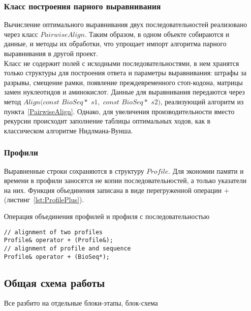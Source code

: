 \subsubsection[Класс построения парного выравнивания]{\large Класс построения парного выравнивания}
\hspace{\parindent} Вычисление оптимального выравнивания двух последовательностей реализовано через  класс $PairwiseAlign$. Таким образом, в одном объекте собираются и данные, и методы их обработки, что упрощает импорт алгоритма парного выравнивания в другой проект.\\
\indent Класс не содержит полей с исходными последовательностями, в нем хранятся только структуры для построения ответа и параметры выравнивания: штрафы за разрывы, смещение рамки, появление преждевременного стоп-кодона, матрицы замен нуклеотидов и аминокислот. Данные для выравнивания передаются через метод $Align(const$ $BioSeq*$ $s1,$ $const$ $BioSeq*$ $s2)$, реализующий алгоритм из пункта~\ref{PairwiseAlign}. Однако, для увеличения производительности вместо рекурсии происходит заполнение таблицы оптимальных ходов, как в классическом алгоритме Нидлмана-Вунша.

\subsubsection[Профили]{\large Профили}
\hspace{\parindent} Выравненные строки сохраняются в структуру $Profile$. Для экономии памяти и времени в профили заносятся не копии последовательностей, а только указатели на них. Функция объединения записана в виде перегруженной операции $+$ (листинг~\ref{lst:ProfilePlus}).
\begin{algorithm}
	\caption{Операция объединения профилей и профиля с последовательностью} \label{lst:ProfilePlus}
	\begin{lstlisting}
// alignment of two profiles
Profile& operator + (Profile&);
// alignment of profile and sequence
Profile& operator + (BioSeq*);
	\end{lstlisting}
\end{algorithm}



\subsection[Общая схема работы]{\large Общая схема работы}
\hspace{\parindent} Все разбито на отдельные блоки-этапы, блок-схема

